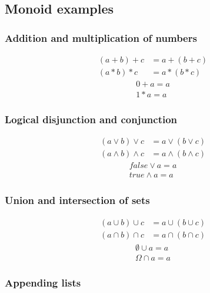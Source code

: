 \documentclass{article}
\begin{document}
    \subsection{Monoid examples}

    \subsubsection{Addition and multiplication of numbers}

    \begin{align*}
        (a + b) + c &= a + (b + c) \\
        (a * b) * c &= a * (b * c)
    \end{align*}
    \begin{align*}
        0 + a = a \\
        1 * a = a  
    \end{align*}

    \subsubsection{Logical disjunction and conjunction}

    \begin{align*}
        (a \vee   b) \vee   c &= a \vee   (b \vee   c) \\
        (a \wedge b) \wedge c &= a \wedge (b \wedge c)
    \end{align*}
    \begin{align*}
        false \vee   a = a \\
        true  \wedge a = a 
    \end{align*}

    \subsubsection{Union and intersection of sets}

    \begin{align*}
        (a \cup b) \cup c &= a \cup (b \cup c) \\
        (a \cap b) \cap c &= a \cap (b \cap c)
    \end{align*}
    \begin{align*}
        \emptyset \cup a = a \\
        \Omega    \cap a = a 
    \end{align*}

    \subsubsection{Appending lists}
\end{document}
